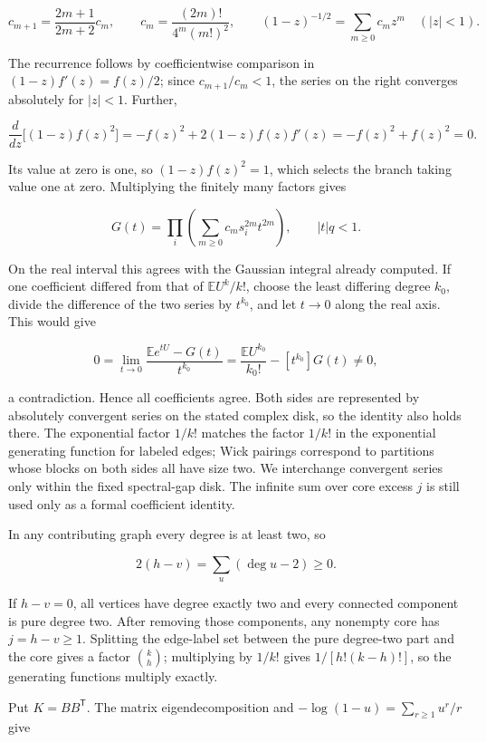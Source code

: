 \documentclass[11pt,a4paper]{article}
\begin{document}
\[
c_{m+1}=\frac{2m+1}{2m+2}c_m,
\qquad
c_m=\frac{(2m)!}{4^m(m!)^2},
\qquad
(1-z)^{-1/2}=\sum_{m\ge0}c_mz^m\quad(|z|<1).
\]

The recurrence follows by coefficientwise comparison in \((1-z)f'(z)=f(z)/2\); since \(c_{m+1}/c_m<1\), the series on the right converges absolutely for \(|z|<1\). Further,

\[
\frac{d}{dz}\bigl[(1-z)f(z)^2\bigr]
=-f(z)^2+2(1-z)f(z)f'(z)
=-f(z)^2+f(z)^2=0.
\]

Its value at zero is one, so \((1-z)f(z)^2=1\), which selects the branch taking value one at zero. Multiplying the finitely many factors gives

\[
G(t)=\prod_i\left(\sum_{m\ge0}c_m s_i^{2m}t^{2m}\right),
\qquad |t|q<1.
\]

On the real interval this agrees with the Gaussian integral already computed. If one coefficient differed from that of \(\mathbb E U^k/k!\), choose the least differing degree \(k_0\), divide the difference of the two series by \(t^{k_0}\), and let \(t\to0\) along the real axis. This would give

\[
0=\lim_{t\to0}\frac{\mathbb Ee^{tU}-G(t)}{t^{k_0}}
=\frac{\mathbb E U^{k_0}}{k_0!}-[t^{k_0}]G(t)\ne0,
\]

a contradiction. Hence all coefficients agree. Both sides are represented by absolutely convergent series on the stated complex disk, so the identity also holds there. The exponential factor \(1/k!\) matches the factor \(1/k!\) in the exponential generating function for labeled edges; Wick pairings correspond to partitions whose blocks on both sides all have size two. We interchange convergent series only within the fixed spectral-gap disk. The infinite sum over core excess \(j\) is still used only as a formal coefficient identity.

In any contributing graph every degree is at least two, so

\[
2(h-v)=\sum_{u}(\deg u-2)\ge0.
\]

If \(h-v=0\), all vertices have degree exactly two and every connected component is pure degree two. After removing those components, any nonempty core has \(j=h-v\ge1\). Splitting the edge-label set between the pure degree-two part and the core gives a factor \(\binom kh\); multiplying by \(1/k!\) gives \(1/[h!(k-h)!]\), so the generating functions multiply exactly.

Put \(K=BB^{\mathsf T}\). The matrix eigendecomposition and \(-\log(1-u)=\sum_{r\ge1}u^r/r\) give
\end{document}
